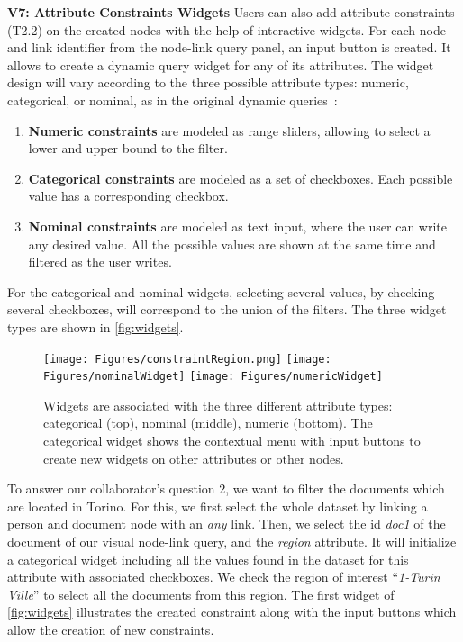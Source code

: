 \noindent\textbf{V7: Attribute Constraints Widgets}\label{sec:attributes}
Users can also add attribute constraints (T2.2) on the created nodes with the help of interactive widgets. For each node and link identifier from the node-link query panel, an input button is created. It allows to
create a dynamic query widget for any of its attributes.
The widget design will vary according to the three possible attribute types: numeric, categorical, or nominal, as in the original dynamic queries~\cite{DynamicQueries}:
\begin{enumerate}
    \item \textbf{Numeric constraints} are modeled as range sliders, allowing to select a lower and upper bound to the filter.
    \item \textbf{Categorical constraints} are modeled as a set of checkboxes. Each possible value has a corresponding checkbox.
    \item \textbf{Nominal constraints} are modeled as text input, where the user can write any desired value. All the possible values are shown at the same time and filtered as the user writes.
\end{enumerate}

For the categorical and nominal widgets, selecting several values, by checking several checkboxes, will correspond to the union of the filters.
The three widget types are shown in \autoref{fig:widgets}.

\begin{figure}
    \centering
    \texttt{[image: Figures/constraintRegion.png]}
    \texttt{[image: Figures/nominalWidget]}
    \texttt{[image: Figures/numericWidget]}


    \caption{Widgets are associated with the three different attribute types: categorical (top), nominal (middle), numeric (bottom). The categorical widget shows the contextual menu with input buttons to create new widgets on other attributes or other nodes.}\label{fig:widgets}
\end{figure}

To answer our collaborator's question 2, we want to filter the documents which are located in Torino. For this, we first select the whole dataset by linking a person and document node with an \textit{any} link. Then, we select the id \textit{doc1} of the document of our visual node-link query, and the \textit{region} attribute. It will initialize a categorical widget including all the values found in the dataset for this attribute with associated checkboxes. We check the region of interest ``\textit{1-Turin Ville}'' to select all the documents from this region. The first widget of \autoref{fig:widgets} illustrates the created constraint along with the input buttons which allow the creation of new constraints.

